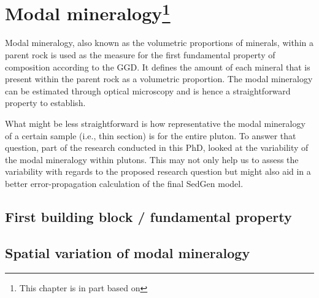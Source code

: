\chapter[Modal mineralogy]{Modal mineralogy\footnote{This chapter is in part based on }}\label{ch:modal_mineralogy}
Modal mineralogy, also known as the volumetric proportions of minerals, within a parent rock is used as the measure for the first fundamental property of composition according to the \gls{GGD}.
It defines the amount of each mineral that is present within the parent rock as a volumetric proportion. %
The modal mineralogy can be estimated through optical microscopy and is hence a straightforward property to establish. %

What might be less straightforward is how representative the modal mineralogy of a certain sample (i.e., thin section) is for the entire pluton. %
To answer that question, part of the research conducted in this PhD, looked at the variability of the modal mineralogy within plutons. %
This may not only help us to assess the variability with regards to the proposed research question but might also aid in a better error-propagation calculation of the final SedGen model. %

\section{First building block / fundamental property}

\section{Spatial variation of modal mineralogy}







\cleardoublepage

